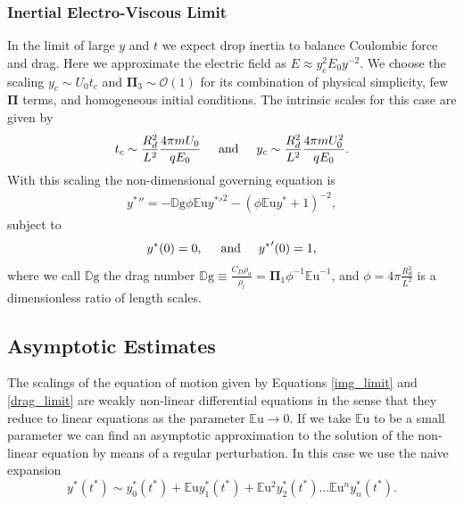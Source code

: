 \documentclass[aip,reprint, floatfix]{revtex4-1}
\begin{document}
\subsubsection{Inertial Electro-Viscous Limit}
In the limit of large $y$ and $t$ we expect drop inertia to balance Coulombic force and drag. Here we approximate the electric field as $E \approx y_c^2 E_0 y^{-2}$. We choose the scaling $y_c \sim U_0 t_c$ and $\mathbf{\Pi}_3 \sim \mathcal{O}(1)$ for its combination of physical simplicity, few $\mathbf{\Pi}$ terms, and homogeneous initial conditions. The intrinsic scales for this case are given by
\[ t_c \sim \frac{R_d^2}{L^2} \frac{4 \pi m U_0}{q E_0} \hspace{5mm} \mbox{and} \hspace{5 mm} y_c \sim \frac{R_d^2}{L^2} \frac{4 \pi m U_0^2}{q E_0}.
\]
With this scaling the non-dimensional governing equation is 
\begin{eqnarray}
&{y^*}'' = - \mathbb{D}\mbox{g} \phi \mathbb{E}\mbox{u} {y^*}'^2 - \left( \phi \mathbb{E}\mbox{u} {y^*} + 1 \right)^{-2}, & \label{drag_limit}
\end{eqnarray}
subject to 
\begin{equation*}
{y^*}(0) = 0, \hspace{5 mm} \mbox{and} \hspace{5 mm} {y^*}'(0) = 1, 
\end{equation*}
where we call $\mathbb{D}\mbox{g}$ the drag number $\mathbb{D}\mbox{g} \equiv \frac{C_D \rho_a}{\rho_l} = \mathbf{\Pi}_1 \phi^{-1}{\mathbb{E}\mbox{u}}^{-1}$, and $\phi = 4 \pi \frac{R_d^2}{L^2}$ is a dimensionless ratio of length scales.

\subsection{Asymptotic Estimates}
The scalings of the equation of motion given by Equations \ref{img_limit} and \ref{drag_limit} are weakly non-linear differential equations in the sense that they reduce to linear equations as the parameter $\mathbb{E}\mbox{u} \rightarrow 0$. If we take $\mathbb{E}\mbox{u}$ to be a small parameter we can find an asymptotic approximation to the solution of the non-linear equation by means of a regular perturbation. In this case we use the naive expansion
\begin{equation}
{y^*}({t^*}) \sim y^*_0({t^*}) + \mathbb{E}\mbox{u} y^*_1({t^*}) + \mathbb{E}\mbox{u}^2 y^*_2({t^*}) \ldots \mathbb{E}\mbox{u}^n y^*_n ({t^*})  . \label{regular_pert}
\end{equation}
\end{document}

